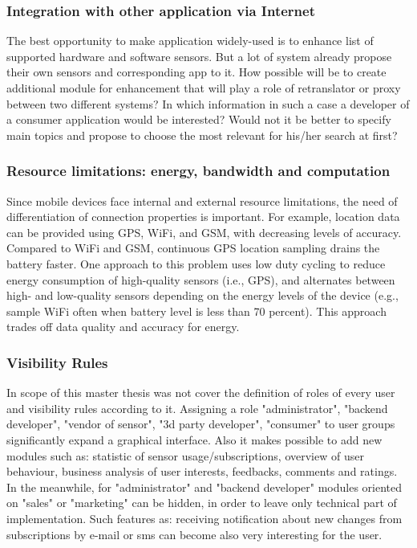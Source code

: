 		\subsubsection {Integration with other application via Internet}
		 The best opportunity to make application widely-used is to enhance list of supported hardware and software sensors. But a lot of system already propose their own sensors and corresponding app to it. How possible will be to create additional module for enhancement that will play a role of retranslator or proxy between two different systems? In which information in such a case a developer of a consumer application would be interested? Would not it be better to specify main topics and propose to choose the most relevant for his/her search at first?

		\subsubsection {Resource limitations: energy, bandwidth and computation}
		Since mobile devices face internal and external resource limitations, the need of differentiation of connection properties is important. For example, location data can be provided using GPS, WiFi, and GSM, with decreasing levels of accuracy. Compared to WiFi and GSM, continuous GPS location sampling drains the battery faster. One approach to this problem uses low duty cycling to reduce energy consumption of high-quality sensors (i.e., GPS), and alternates between high- and low-quality sensors depending on the energy levels of the device (e.g., sample WiFi often when battery level is less than 70 percent). This approach trades off data quality and accuracy for energy. 

		\subsubsection {Visibility Rules}
		In scope of this master thesis was not cover the definition of roles of every user and visibility rules according to it. Assigning a role "administrator", "backend developer", "vendor of sensor", "3d party developer", "consumer" to user groups significantly expand a graphical interface. Also it makes possible to add new modules such as: statistic of sensor usage/subscriptions, overview of user behaviour, business analysis of user interests, feedbacks, comments and ratings. In the meanwhile, for "administrator" and "backend developer" modules oriented on "sales" or "marketing" can be hidden, in order to leave only technical part of implementation. Such features as: receiving notification about new changes from subscriptions by e-mail or sms can become also very interesting for the user.
